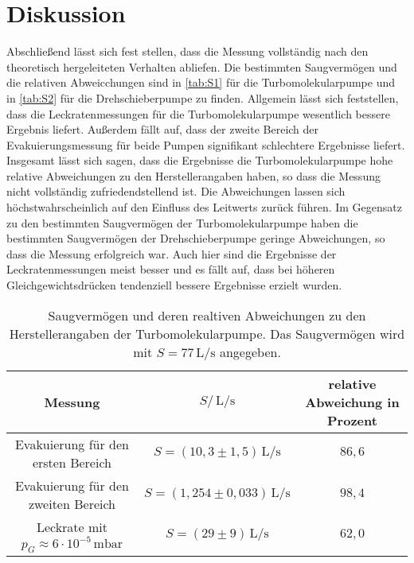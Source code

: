 \section{Diskussion}
\label{sec:Diskussion}
Abschließend lässt sich fest stellen, dass die Messung vollständig nach den theoretisch hergeleiteten Verhalten
abliefen. Die bestimmten Saugvermögen und die relativen Abweicchungen sind in \autoref{tab:S1} für die
Turbomolekularpumpe und in \autoref{tab:S2} für die Drehschieberpumpe zu finden. Allgemein lässt sich feststellen,
dass die Leckratenmessungen für die Turbomolekularpumpe wesentlich bessere Ergebnis liefert.
Außerdem fällt auf, dass der zweite Bereich der Evakuierungsmessung für beide Pumpen signifikant schlechtere
Ergebnisse liefert. Insgesamt lässt sich sagen, dass die Ergebnisse die Turbomolekularpumpe hohe relative
Abweichungen zu den Herstellerangaben haben, so dass die Messung nicht vollständig zufriedendstellend ist.
Die Abweichungen lassen sich höchstwahrscheinlich auf den Einfluss des Leitwerts zurück führen. Im
Gegensatz zu den bestimmten Saugvermögen der Turbomolekularpumpe haben die bestimmten Saugvermögen der
Drehschieberpumpe geringe Abweichungen, so dass die Messung erfolgreich war. Auch hier sind die Ergebnisse der
Leckratenmessungen meist besser und es fällt auf, dass bei höheren Gleichgewichtsdrücken tendenziell bessere
Ergebnisse erzielt wurden. 
\begin{table}
    \centering
    \caption{Saugvermögen und deren realtiven Abweichungen zu den Herstellerangaben der Turbomolekularpumpe. Das
    Saugvermögen wird mit $S=77\,\si{\liter\per\second}$ angegeben.}
    \label{tab:S1}
    \begin{tabular}{c c c}
        \toprule
        Messung & $S/\,\si{\liter\per\second}$ & relative Abweichung in Prozent \\
        \midrule
        Evakuierung für den ersten Bereich & $S = (10,3 \pm 1,5)\,\si{\liter\per\second}$ & $86,6$ \\
        Evakuierung für den zweiten Bereich & $S =(1,254 \pm 0,033)\,\si{\liter\per\second}$ & $98,4 $ \\
        Leckrate mit $p_G \approx 6 \cdot 10^{-5} \,\si{\milli\bar}$ & $S = (29 \pm 9)\,\si{\liter\per\second}$ & $62,0$\\
        \bottomrule
    \end{tabular}
\end{table}

